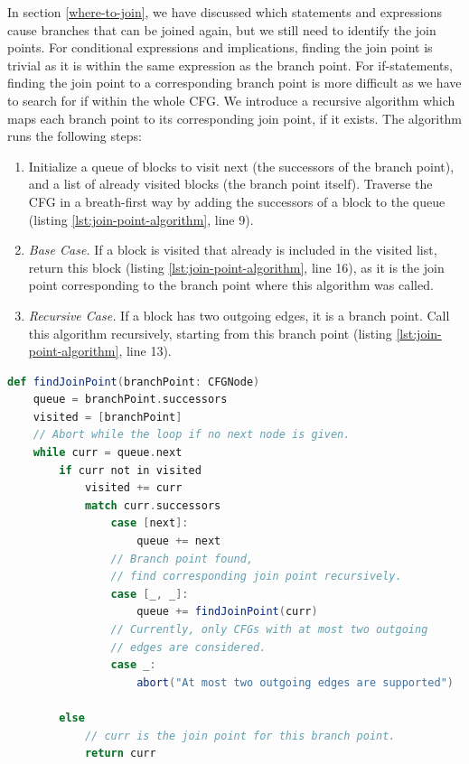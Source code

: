 \documentclass[11pt]{article}
\begin{document}
    In section \ref{where-to-join}, we have discussed which statements and expressions cause
    branches that can be joined again, but we still need to identify the join points.
    For conditional expressions and implications, finding the join point is trivial
    as it is within the same expression as the branch point.
    For if-statements, finding the join point to a corresponding branch point is more 
    difficult as we have to search
    for if within the whole CFG.
    We introduce a recursive algorithm which maps each branch point to its corresponding join point,
    if it exists. The algorithm runs the following steps:

    \begin{enumerate}
        \item Initialize a queue of blocks to visit next (the successors of the branch point),
            and a list of already visited blocks (the branch point itself).
            Traverse the CFG in a breath-first way by adding the successors of a block
            to the queue (listing \ref{lst:join-point-algorithm}, line 9).
        \item \emph{Base Case.} If a block is visited that already is included in the visited list,
            return this block (listing \ref{lst:join-point-algorithm}, line 16), as it is the join point corresponding to the branch point where this algorithm was called.
        \item \emph{Recursive Case.} If a block has two outgoing edges, it is a branch point.
            Call this algorithm recursively, starting from this branch point (listing \ref{lst:join-point-algorithm}, line 13).
    \end{enumerate}

    \begin{lstlisting}[language=Scala, caption={The join point finding algorithm without support for loops.}, label={lst:join-point-algorithm}]
def findJoinPoint(branchPoint: CFGNode)
    queue = branchPoint.successors
    visited = [branchPoint]
    // Abort while the loop if no next node is given.
    while curr = queue.next
        if curr not in visited
            visited += curr
            match curr.successors
                case [next]:
                    queue += next
                // Branch point found,
                // find corresponding join point recursively.
                case [_, _]:
                    queue += findJoinPoint(curr)
                // Currently, only CFGs with at most two outgoing
                // edges are considered.
                case _:
                    abort("At most two outgoing edges are supported")

        else
            // curr is the join point for this branch point.
            return curr

    
        
    \end{lstlisting}
\end{document}
